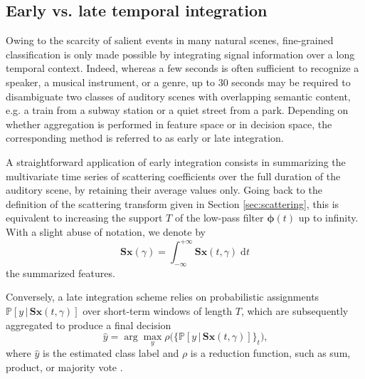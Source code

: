 \documentclass[journal]{IEEEtran}
\makeatletter
\newcommand*{\eg}{e.g.\@\xspace}
\newcommand*{\vs}{vs.\@\xspace}
\makeatother
\begin{document}
\subsection{Early \vs late temporal integration}
\label{sec:eili}

Owing to the scarcity of salient events in many natural scenes,
fine-grained classification is only made
possible by integrating signal information over a long temporal context.
Indeed, whereas a few seconds is often sufficient to recognize a speaker,
a musical instrument, or a genre, up to $30$ seconds may be required
to disambiguate two classes of auditory scenes with overlapping semantic content, \eg a train from a subway station or a quiet street from a park.
Depending on whether aggregation is performed in feature space or in decision space, the corresponding method is referred to as early or late integration.

A straightforward application of early integration consists in summarizing the multivariate time series of scattering coefficients over the full duration of the auditory scene, by retaining their average values only.
Going back to the definition of the scattering transform given in Section \ref{sec:scattering}, this is equivalent to increasing the support $T$ of the low-pass filter $\boldsymbol{\phi}(t)$ up to infinity. With a slight abuse of notation, we denote by
\begin{equation}
\mathbf{S}\boldsymbol{x}(\gamma) =
\int_{-\infty}^{+\infty} \mathbf{S}\boldsymbol{x}(t,\gamma)\;\mathrm{d}t
\end{equation}
the summarized features.

Conversely, a late integration scheme relies on probabilistic assignments $\mathbb{P}\left[y \,\vert\, \mathbf{S}\boldsymbol{x}(t,\gamma) \right]$ over short-term windows of length $T$, which are subsequently aggregated to produce a final decision
\begin{equation}
\hat{y} = \arg \max_{y} \rho\Big(\big\{ \mathbb{P}\left[y \,\vert\, \mathbf{S}\boldsymbol{x}(t,\gamma) \right] \big\}_{t} \Big)\mbox{,}
\end{equation}
where $\hat{y}$ is the estimated class label and $\rho$ is a reduction function, such as sum, product, or majority vote \cite{Kittler1998}.
\end{document}
